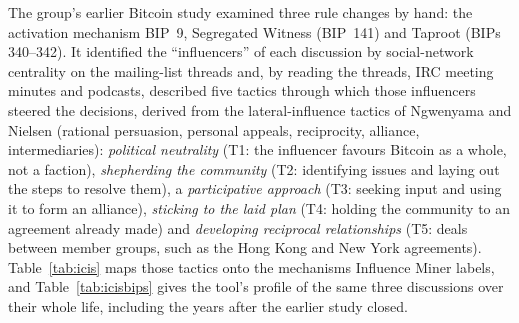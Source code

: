 \documentclass[sigconf,screen]{acmart}
\begin{document}
The group's earlier Bitcoin study \cite{thapa2021bitcoin} examined three rule changes by hand: the activation mechanism BIP~9, Segregated Witness (BIP~141) and Taproot (BIPs 340--342). It identified the ``influencers'' of each discussion by social-network centrality on the mailing-list threads and, by reading the threads, IRC meeting minutes and podcasts, described five tactics through which those influencers steered the decisions, derived from the lateral-influence tactics of Ngwenyama and Nielsen \cite{ngwenyama2014} (rational persuasion, personal appeals, reciprocity, alliance, intermediaries): \emph{political neutrality} (T1: the influencer favours Bitcoin as a whole, not a faction), \emph{shepherding the community} (T2: identifying issues and laying out the steps to resolve them), a \emph{participative approach} (T3: seeking input and using it to form an alliance), \emph{sticking to the laid plan} (T4: holding the community to an agreement already made) and \emph{developing reciprocal relationships} (T5: deals between member groups, such as the Hong Kong and New York agreements). Table~\ref{tab:icis} maps those tactics onto the mechanisms Influence Miner labels, and Table~\ref{tab:icisbips} gives the tool's profile of the same three discussions over their whole life, including the years after the earlier study closed.
\end{document}

